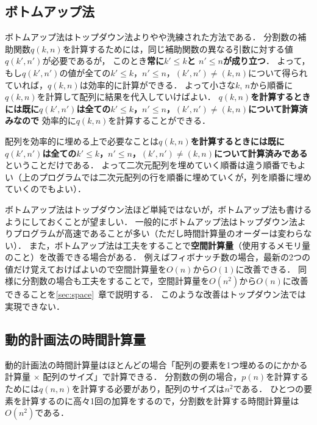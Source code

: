 \documentclass[a4paper,twoside,onecolumn,openany,article]{memoir}
\theoremstyle{remark}
\begin{document}
\subsection{ボトムアップ法}
ボトムアップ法はトップダウン法よりやや洗練された方法である．
分割数の補助関数$q(k,n)$を計算するためには，同じ補助関数の異なる引数に対する値$q(k',n')$が必要であるが，
このとき\textbf{常に$k'\le k$と $n'\le n$が成り立つ}．
よって，もし$q(k',n')$の値が全ての$k'\le k$，$n'\le n$，$(k',n')\ne(k,n)$について得られていれば，$q(k,n)$は効率的に計算ができる．
よって小さな$k$, $n$から順番に$q(k,n)$を計算して配列に結果を代入していけばよい．
\textbf{$q(k, n)$を計算するときには既に$q(k', n')$は全ての$k'\le k$，$n'\le n$，$(k',n')\ne (k,n)$について計算済みなので}
効率的に$q(k,n)$を計算することができる．


配列を効率的に埋める上で必要なことは\textbf{$q(k, n)$を計算するときには既に$q(k', n')$は全ての$k'\le k$，$n'\le n$，$(k',n')\ne (k,n)$について計算済みである}
ということだけである．
よって二次元配列を埋めていく順番は違う順番でもよい（上のプログラムでは二次元配列の行を順番に埋めていくが，列を順番に埋めていくのでもよい）．

ボトムアップ法はトップダウン法ほど単純ではないが，ボトムアップ法も書けるようにしておくことが望ましい．
一般的にボトムアップ法はトップダウン法よりプログラムが高速であることが多い（ただし時間計算量のオーダーは変わらない）．
また，ボトムアップ法は工夫をすることで\textbf{空間計算量}（使用するメモリ量のこと）を改善できる場合がある．
例えばフィボナッチ数の場合，最新の2つの値だけ覚えておけばよいので空間計算量を$O(n)$から$O(1)$に改善できる．
同様に分割数の場合も工夫をすることで，空間計算量を$O(n^2)$から$O(n)$に改善できることを\ref{sec:space}~章で説明する．
このような改善はトップダウン法では実現できない．


\subsection{動的計画法の時間計算量}
動的計画法の時間計算量はほとんどの場合「配列の要素を1つ埋めるのにかかる計算量 $\times$ 配列のサイズ」で計算できる．
分割数の例の場合，$p(n)$を計算するためには$q(n,n)$を計算する必要があり，配列のサイズは$n^2$である．
ひとつの要素を計算するのに高々1回の加算をするので，分割数を計算する時間計算量は$O(n^2)$である．
\end{document}
